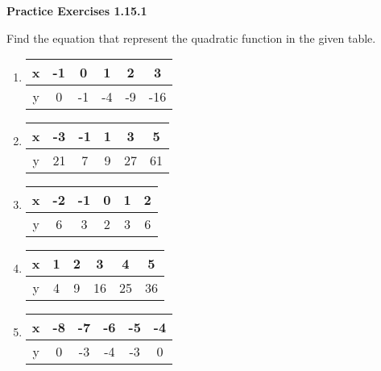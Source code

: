 \vspace{1ex}
\noindent\textbf{Practice Exercises 1.15.1}

\vspace{0.75ex}

Find the equation that represent the quadratic function in the given table.
\begin{multicols}{2}
\begin{enumerate}[label = \color{blue}\arabic*. ]
\item \begin{tabular}{|*6{c|}} 
\hline 
x & -1 & 0 & 1 & 2 & 3 \\
\hline 
y & 0 & -1 & -4 & -9 & -16 \\
\hline 
\end{tabular}
\item  \begin{tabular}{|*6{c|}} 
\hline 
x & -3 & -1 & 1 & 3 & 5 \\
\hline 
y & 21 & 7 & 9 & 27 & 61 \\
\hline 
\end{tabular}
\item  \begin{tabular}{|*6{c|}} 
\hline 
x & -2 & -1 & 0 & 1 & 2 \\
\hline 
y & 6 & 3 & 2 & 3 & 6 \\
\hline 
\end{tabular} 
\item  \begin{tabular}{|*6{c|}} 
\hline 
x & 1 & 2 & 3 & 4 & 5 \\
\hline 
y & 4 & 9 & 16 & 25 & 36 \\
\hline 
\end{tabular} 
\item  \begin{tabular}{|*6{c|}} 
\hline 
x & -8 & -7 & -6 & -5 & -4 \\
\hline 
y & 0 & -3 & -4 & -3 & 0 \\
\hline 
\end{tabular} 
\end{enumerate}
\end{multicols} 

